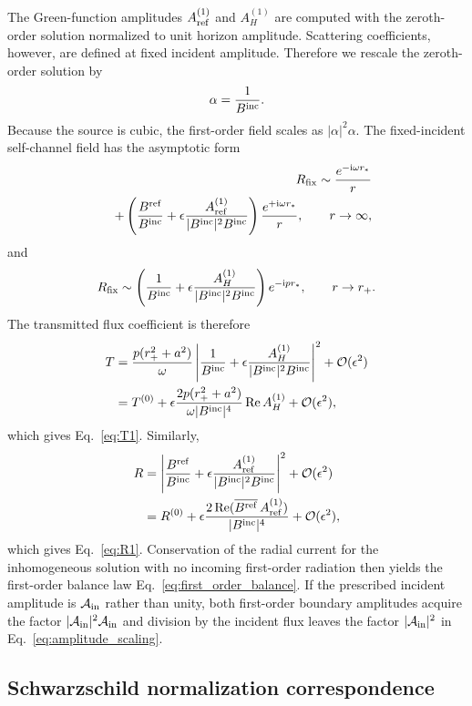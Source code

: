 \documentclass[aps,prd,twocolumn,10pt,nofootinbib,superscriptaddress,floatfix]{revtex4-2}
\newcommand{\ii}{\mathrm{i}}
\newcommand{\calO}{\mathcal{O}}
\newcommand{\rp}{r_+}
\newcommand{\Bin}{B^{\rm inc}}
\newcommand{\Bref}{B^{\rm ref}}
\newcommand{\Aref}{A_{\rm ref}^{(1)}}
\newcommand{\AH}{A_H^{(1)}}
\begin{document}
The Green-function amplitudes $\Aref$ and $\AH$ are computed with the
zeroth-order solution normalized to unit horizon amplitude.  Scattering
coefficients, however, are defined at fixed incident amplitude.  Therefore we
rescale the zeroth-order solution by
\begin{equation}
\alpha=\frac{1}{\Bin}.
\end{equation}
Because the source is cubic, the first-order field scales as
$|\alpha|^2\alpha$.  The fixed-incident self-channel field has the asymptotic
form
\begin{align}
R_{\rm fix}\sim
\frac{e^{-\ii\omega r_*}}{r}
\nonumber\\
\quad
+\left(\frac{\Bref}{\Bin}
+\epsilon\frac{\Aref}{|\Bin|^2\Bin}\right)
\frac{e^{+\ii\omega r_*}}{r},
\qquad r\rightarrow\infty ,
\end{align}
and
\begin{equation}
R_{\rm fix}\sim
\left(\frac{1}{\Bin}
+\epsilon\frac{\AH}{|\Bin|^2\Bin}\right)
e^{-\ii p r_*},
\qquad r\rightarrow\rp .
\end{equation}
The transmitted flux coefficient is therefore
\begin{align}
T&=\frac{p(\rp^2+a^2)}{\omega}
\left|
\frac{1}{\Bin}
+\epsilon\frac{\AH}{|\Bin|^2\Bin}
\right|^2+\calO(\epsilon^2)
\nonumber\\
&=T^{(0)}+\epsilon
\frac{2p(\rp^2+a^2)}{\omega|\Bin|^4}
\operatorname{Re}\AH+\calO(\epsilon^2),
\end{align}
which gives Eq.~\eqref{eq:T1}.  Similarly,
\begin{align}
R&=
\left|
\frac{\Bref}{\Bin}
+\epsilon\frac{\Aref}{|\Bin|^2\Bin}
\right|^2+\calO(\epsilon^2)
\nonumber\\
&=R^{(0)}+\epsilon
\frac{2\operatorname{Re}(\overline{\Bref}\,\Aref)}
{|\Bin|^4}+\calO(\epsilon^2),
\end{align}
which gives Eq.~\eqref{eq:R1}.  Conservation of the radial current for the
inhomogeneous solution with no incoming first-order radiation then yields the
first-order balance law Eq.~\eqref{eq:first_order_balance}.  If the prescribed
incident amplitude is ${\cal A}_{\rm in}$ rather than unity, both first-order
boundary amplitudes acquire the factor
$|{\cal A}_{\rm in}|^2{\cal A}_{\rm in}$ and division by the incident flux
leaves the factor $|{\cal A}_{\rm in}|^2$ in
Eq.~\eqref{eq:amplitude_scaling}.

\subsection{Schwarzschild normalization correspondence}
\end{document}
